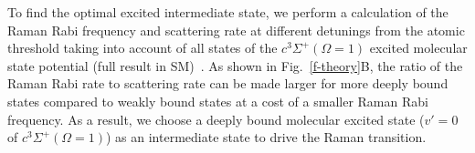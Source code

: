 \documentclass[aps,prl,twocolumn,superscriptaddress]{revtex4-1}
\begin{document}


To find the optimal excited intermediate state, we perform a  calculation of the Raman Rabi frequency and scattering rate at different detunings from the atomic threshold taking into account of all states of the $c^3\Sigma^+(\Omega = 1)$ excited molecular state potential (full result in SM)~\cite{Liu2017, Grochola2011}. As shown in Fig.~\ref{f-theory}B, the ratio of the Raman Rabi rate to scattering rate can be made larger for more deeply bound states compared to weakly bound states at a cost of a smaller Raman Rabi frequency.  %
As a result, we choose a deeply bound molecular excited state ($v'=0$ of $c^3\Sigma^+(\Omega = 1)$) as an intermediate state to drive the Raman transition. %

\end{document}
